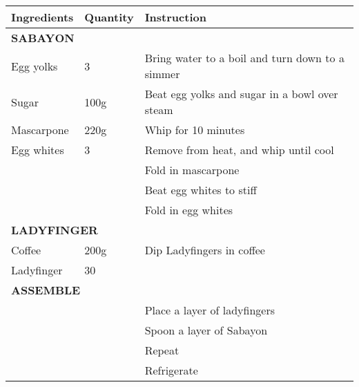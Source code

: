 \documentclass{article}
\newcommand{\tabletitle}[1]{\midrule\multicolumn{3}{l}{\textbf{\color{BrickRed} \MakeUppercase{#1}}}}
\begin{document}
\begin{tabular}{lll} \toprule
  \textbf{Ingredients} & \textbf{Quantity} & \textbf{Instruction}                            \\
  \tabletitle{Sabayon}                                                                       \\
  Egg yolks            & 3                 & Bring water to a boil and turn down to a simmer \\
  Sugar                & 100g              & Beat egg yolks and sugar in a bowl over steam   \\
  Mascarpone           & 220g              & Whip for 10 minutes                             \\
  Egg whites           & 3                 & Remove from heat, and whip until cool           \\
                       &                   & Fold in mascarpone                              \\
                       &                   & Beat egg whites to stiff                        \\
                       &                   & Fold in egg whites                              \\
  \tabletitle{Ladyfinger}                                                                    \\
  Coffee               & 200g              & Dip Ladyfingers in coffee                       \\
  Ladyfinger           & 30                &                                                 \\
  \tabletitle{Assemble}                                                                      \\
                       &                   & Place a layer of ladyfingers                    \\
                       &                   & Spoon a layer of Sabayon                        \\
                       &                   & Repeat                                          \\
                       &                   & Refrigerate                                     \\
  \bottomrule
\end{tabular}
\end{document}
